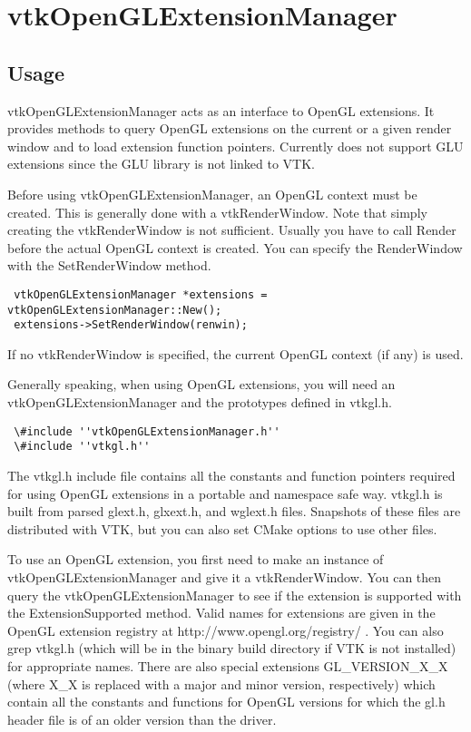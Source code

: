 \section{vtkOpenGLExtensionManager}

\subsection{Usage}


 vtkOpenGLExtensionManager acts as an interface to OpenGL extensions.  It
 provides methods to query OpenGL extensions on the current or a given
 render window and to load extension function pointers.  Currently does
 not support GLU extensions since the GLU library is not linked to VTK.

 Before using vtkOpenGLExtensionManager, an OpenGL context must be created.
 This is generally done with a vtkRenderWindow.  Note that simply creating
 the vtkRenderWindow is not sufficient.  Usually you have to call Render
 before the actual OpenGL context is created.  You can specify the
 RenderWindow with the SetRenderWindow method.
 \begin{verbatim}
 vtkOpenGLExtensionManager *extensions = vtkOpenGLExtensionManager::New();
 extensions->SetRenderWindow(renwin);
 \end{verbatim}
 If no vtkRenderWindow is specified, the current OpenGL context (if any)
 is used.

 Generally speaking, when using OpenGL extensions, you will need an
 vtkOpenGLExtensionManager and the prototypes defined in vtkgl.h.
 \begin{verbatim}
 \#include ''vtkOpenGLExtensionManager.h''
 \#include ''vtkgl.h''
 \end{verbatim}
 The vtkgl.h include file contains all the constants and function
 pointers required for using OpenGL extensions in a portable and
 namespace safe way.  vtkgl.h is built from parsed glext.h, glxext.h, and
 wglext.h files.  Snapshots of these files are distributed with VTK,
 but you can also set CMake options to use other files.

 To use an OpenGL extension, you first need to make an instance of
 vtkOpenGLExtensionManager and give it a vtkRenderWindow.  You can then
 query the vtkOpenGLExtensionManager to see if the extension is supported
 with the ExtensionSupported method.  Valid names for extensions are
 given in the OpenGL extension registry at
 http://www.opengl.org/registry/ .
 You can also grep vtkgl.h (which will be in the binary build directory
 if VTK is not installed) for appropriate names.  There are also
 special extensions GL\_VERSION\_X\_X (where X\_X is replaced with a major
 and minor version, respectively) which contain all the constants and
 functions for OpenGL versions for which the gl.h header file is of an
 older version than the driver.

